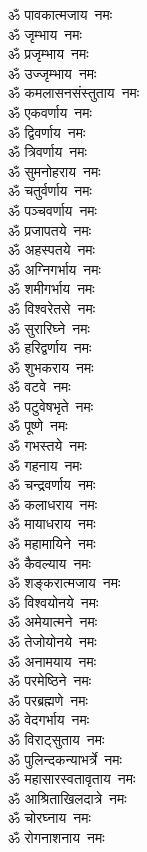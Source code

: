 \begin{multicols}{2}
\begin{flushleft}
ॐ पावकात्मजाय~नमः\\
ॐ जृम्भाय~नमः\\
ॐ प्रजृम्भाय~नमः\\
ॐ उज्जृम्भाय~नमः\\
ॐ कमलासनसंस्तुताय~नमः\\
ॐ एकवर्णाय~नमः\\
ॐ द्विवर्णाय~नमः\\
ॐ त्रिवर्णाय~नमः\\
ॐ सुमनोहराय~नमः\\
ॐ चतुर्वर्णाय~नमः\hfill{}\\
ॐ पञ्चवर्णाय~नमः\\
ॐ प्रजापतये~नमः\\
ॐ अहस्पतये~नमः\\
ॐ अग्निगर्भाय~नमः\\
ॐ शमीगर्भाय~नमः\\
ॐ विश्वरेतसे~नमः\\
ॐ सुरारिघ्ने~नमः\\
ॐ हरिद्वर्णाय~नमः\\
ॐ शुभकराय~नमः\\
ॐ वटवे~नमः\hfill{}\\
ॐ पटुवेषभृते~नमः\\
ॐ पूष्णे~नमः\\
ॐ गभस्तये~नमः\\
ॐ गहनाय~नमः\\
ॐ चन्द्रवर्णाय~नमः\\
ॐ कलाधराय~नमः\\
ॐ मायाधराय~नमः\\
ॐ महामायिने~नमः\\
ॐ कैवल्याय~नमः\\
ॐ शङ्करात्मजाय~नमः\hfill{}\\
ॐ विश्वयोनये~नमः\\
ॐ अमेयात्मने~नमः\\
ॐ तेजोयोनये~नमः\\
ॐ अनामयाय~नमः\\
ॐ परमेष्ठिने~नमः\\
ॐ परब्रह्मणे~नमः\\
ॐ वेदगर्भाय~नमः\\
ॐ विराट्सुताय~नमः\\
ॐ पुलिन्दकन्याभर्त्रे~नमः\\
ॐ महासारस्वतावृताय~नमः\hfill{}\\
ॐ आश्रिताखिलदात्रे~नमः\\
ॐ चोरघ्नाय~नमः\\
ॐ रोगनाशनाय~नमः\\

\end{flushleft}
\end{multicols}
